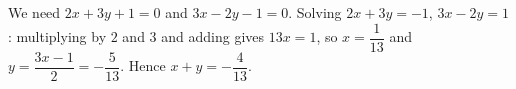 We need $2x+3y+1=0$ and $3x-2y-1=0$. Solving $2x+3y=-1$, $3x-2y=1$: multiplying by $2$ and $3$ and adding gives $13x=1$, so $x=\dfrac{1}{13}$ and $y=\dfrac{3x-1}{2}=-\dfrac{5}{13}$. Hence $x+y=\boxed{-\dfrac{4}{13}}$.
